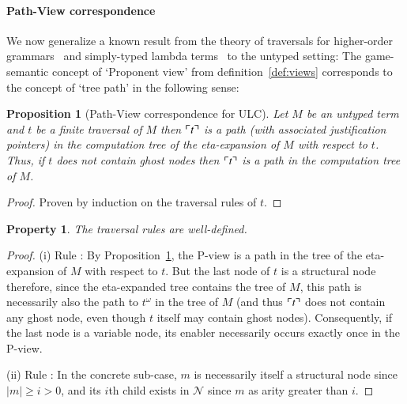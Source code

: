 \documentclass{elsarticle}
\theoremstyle{plain}
\newtheorem{proposition}[theorem]{Proposition}
\newtheorem{property}[theorem]{Property}
\theoremstyle{definition}
\theoremstyle{remark}
\newcommand\Nodes{\mathcal{N}}%
\begin{document}
\paragraph{Path-View correspondence}
We now generalize a known result from the theory of traversals for higher-order grammars~\cite{Ong2006} and simply-typed lambda terms~\cite[Proposition 4.29]{BlumPhd} to the untyped setting: The game-semantic concept of `Proponent view' from definition~\ref{def:views} corresponds to the concept of `tree path' in the following sense:

\begin{proposition}[Path-View correspondence for ULC]
\label{prop:pathview_ulc}
Let $M$ be an untyped term and $t$ be a \emph{finite} traversal of $M$ then
$\ulcorner t \urcorner$ is a path (with associated justification pointers) in the computation tree of the eta-expansion of $M$ with respect to $t$. Thus, if $t$ does not contain ghost nodes then $\ulcorner t \urcorner$ is a path in the computation tree of $M$.
\end{proposition}
\begin{proof}
Proven by induction on the traversal rules of $t$.
\end{proof}

\begin{property}
The traversal rules are well-defined.
\end{property}
\begin{proof}
(i) Rule : By Proposition~\ref{prop:pathview_ulc}, the P-view is a path in the tree of the eta-expansion of $M$ with respect to $t$. But the last node of $t$ is a structural node therefore, since the eta-expanded tree contains the tree of $M$, this path is necessarily also the path to $t^\omega$ in the tree of $M$ (and thus $\ulcorner t \urcorner$ does not contain any ghost node, even though $t$ itself may contain ghost nodes).
 Consequently, if the last node is a variable node, its enabler necessarily occurs exactly once in the P-view.

(ii) Rule : In the concrete sub-case, $m$ is necessarily itself a structural node since $|m|\geq i>0$, and its $i$th child exists in $\Nodes$ since $m$ as arity greater than $i$.
\end{proof}
\end{document}
